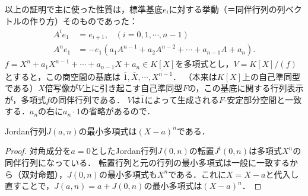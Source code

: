\documentclass[uplatex, dvipdfmx]{jsreport}
\begin{document}
\begin{remark}[環論的根拠]
    以上の証明で主に使った性質は，標準基底$e_i$に対する挙動（＝同伴行列の列ベクトルの作り方）そのものであった：
    \begin{align*}
        A^ie_1&=e_{i+1},\;\;\;(i=0,1,\cdots,n-1)\\
        A^ne_1&=-e_1(a_1A^{n-1}+a_2A^{n-2}+\cdots+a_{n-1}A+a_n).
    \end{align*}
    $f=X^n+a_1X^{n-1}+\cdots +a_{n-1}X+a_n \in K[X]$を多項式とし，$V=K[X]/(f)$とすると，この商空間の基底は
    $\overline{1},\overline{X},\cdots,\overline{X^{n-1}}$．
    （本来は$K[X]$上の自己準同型である）$X$倍写像が$V$上に引き起こす自己準同型$F$の，この基底に関する行列表示が，多項式$f$の同伴行列である．
    $V$は$\overline{1}$によって生成される$F$-安定部分空間と一致する．$a_n$の右に$a_n\cdot 1$の省略があるので．
\end{remark}

\begin{corollary}
    Jordan行列$J(a,n)$の最小多項式は$(X-a)^n$である．
\end{corollary}
\begin{proof}
    対角成分を$a=0$としたJordan行列$J(0,n)$の転置$J^t(0,n)$は多項式$X^n$の同伴行列になっている．
    転置行列と元の行列の最小多項式は一般に一致するから（双対命題），$J(0,n)$の最小多項式も$X^n$である．これに$X=X-a$と代入し直すことで，$J(a,n)=a+J(0,n)$の最小多項式は$(X-a)^n$．
\end{proof}
\end{document}
